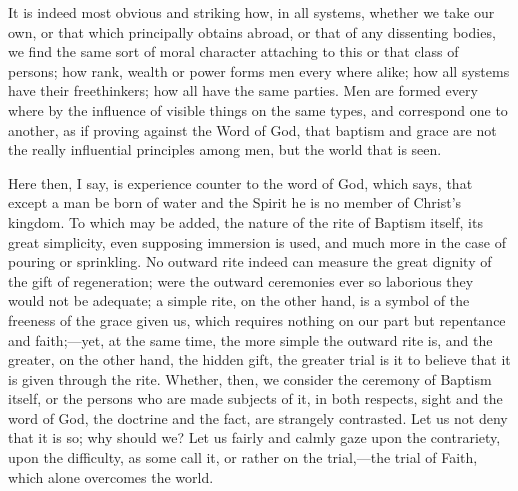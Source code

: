 It is indeed most obvious and striking how, in all systems, whether
we take our own, or that which principally obtains abroad, or that of
any dissenting bodies, we find the same sort of moral character
attaching to this or that class of persons; how rank, wealth or power
forms men every where alike; how all systems have their freethinkers;
how all have the same parties. Men are formed every where by the
influence of visible things on the same types, and correspond one to
another, as if proving against the Word of God, that baptism and grace
are not the really influential principles among men, but the world
that is seen.

Here then, I say, is experience counter to the word of God, which
says, that except a man be born of water and the Spirit he is no
member of Christ's kingdom. To which may be added, the nature of the
rite of Baptism itself, its great simplicity, even supposing immersion
is used, and much more in the case of pouring or sprinkling. No
outward rite indeed can measure the great dignity of the gift of
regeneration; were the outward ceremonies ever so laborious they would
not be adequate; a simple rite, on the other hand, is a symbol of the
freeness of the grace given us, which requires nothing on our part but
repentance and faith;—yet, at the same time, the more simple the
outward rite is, and the greater, on the other hand, the hidden gift,
the greater trial is it to believe that it is given through the rite.
Whether, then, we consider the ceremony of Baptism itself, or the
persons who are made subjects of it, in both respects, sight and the
word of God, the doctrine and the fact, are strangely contrasted. Let
us not deny that it is so; why should we? Let us fairly and calmly
gaze upon the contrariety, upon the difficulty, as some call it, or
rather on the trial,—the trial of Faith, which alone overcomes the
world.


